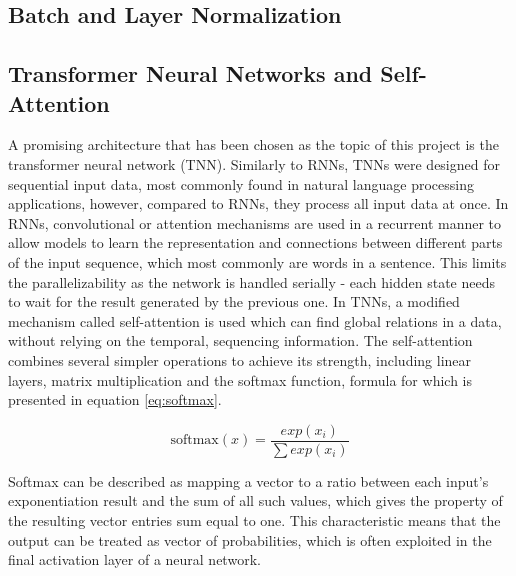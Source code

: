 \subsection{Batch and Layer Normalization}
\indo{|}
\indo{|}
\indo{|}
\indo{|}
\indo{|}


\subsection{Transformer Neural Networks and Self-Attention}\label{self-attention}
A promising architecture that has been chosen as the topic of this project is the transformer neural network (TNN). Similarly to RNNs, TNNs were designed for sequential input data, most commonly found in natural language processing applications, however, compared to RNNs, they process all input data at once. In RNNs, convolutional \cite{72-keren2016convolutional} or attention mechanisms \cite{71-chorowski2015attention-based} are used in a recurrent manner to allow models to learn the representation and connections between different parts of the input sequence, which most commonly are words in a sentence. This limits the parallelizability as the network is handled serially - each hidden state needs to wait for the result generated by the previous one. In TNNs, a modified mechanism called self-attention \cite{44-vaswani2017attention} is used which can find global relations in a data, without relying on the temporal, sequencing information. The self-attention combines several simpler operations to achieve its strength, including linear layers, matrix multiplication and the softmax function, formula for which is presented in equation \ref{eq:softmax}.

\begin{equation}\label{eq:softmax}
  \text{softmax}(x) = \frac{exp(x_i)}{\sum exp(x_i)}
\end{equation}

Softmax can be described as mapping a vector to a ratio between each input's exponentiation result and the sum of all such values, which gives the property of the resulting vector entries sum equal to one. This characteristic means that the output can be treated as vector of probabilities, which is often exploited in the final activation layer of a neural network.

